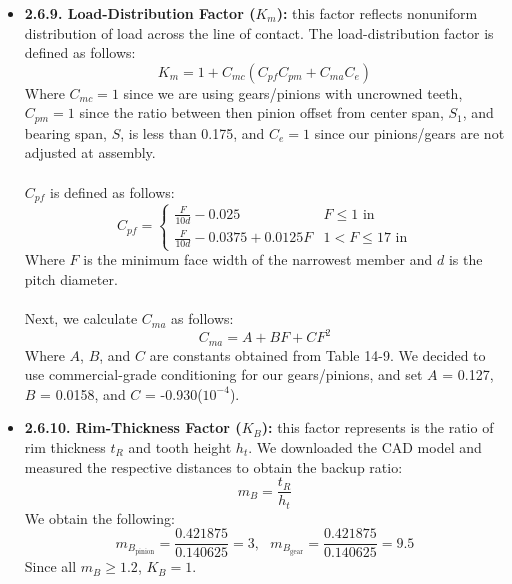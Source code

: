 \documentclass[letterpaper,12pt]{article}
\begin{document}
\begin{itemize}[leftmargin=3mm]
    \item \textbf{2.6.9. Load-Distribution Factor ($K_m$):} this factor reflects nonuniform distribution of load across the line of contact. The load-distribution factor is defined as follows:
    \begin{equation}
        K_m = 1 + C_{mc}(C_{pf}C_{pm} + C_{ma}C_{e})
    \end{equation}
    Where $C_{mc} = 1$ since we are using gears/pinions with uncrowned teeth, $C_{pm} = 1$ since the ratio between then pinion offset from center span, $S_1$, and bearing span, $S$, is less than 0.175, and $C_e = 1$ since our pinions/gears are not adjusted at assembly. \\\\
    $C_{pf}$ is defined as follows: 
    \begin{equation}
    C_{pf} = \begin{cases} 
	\frac{F}{10d} - 0.025 & F \leq 1 \text{ in} \\
	\frac{F}{10d} -0.0375+0.0125F & 1 < F \leq 17 \text{ in}
	\end{cases} 
	\end{equation}
    Where $F$ is the minimum face width of the narrowest member and $d$ is the pitch diameter. \\\\
    Next, we calculate $C_{ma}$ as follows:
    \begin{equation*}
        C_{ma} = A + BF + CF^2
    \end{equation*}
    Where $A$, $B$, and $C$ are constants obtained from Table 14-9. We decided to use commercial-grade conditioning for our gears/pinions, and set $A$ = 0.127, $B$ = 0.0158, and $C$ = -0.930($10^{-4}$).
    
    \item \textbf{2.6.10. Rim-Thickness Factor ($K_B$):} this factor represents is the ratio of rim thickness $t_R$ and tooth height $h_t$. We downloaded the CAD model and measured the respective distances to obtain the backup ratio: 
    \begin{equation*}
    m_B = \frac{t_R}{h_t}
    \end{equation*}
    We obtain the following:
    \begin{equation*}
        m_{B_{\text{pinion}}} = \frac{ 0.421875}{0.140625} = 3, \text{ }m_{B_{\text{gear}}} = \frac{ 0.421875}{0.140625} = 9.5
    \end{equation*}
    Since all $m_B \geq 1.2$, $K_B = 1$.

\end{itemize}
\end{document}
